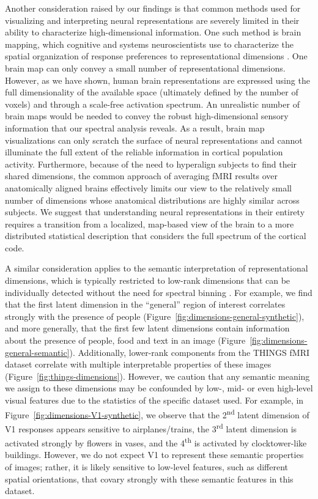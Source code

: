 \documentclass[10pt]{article}
\begin{document}
Another consideration raised by our findings is that common methods used for visualizing and interpreting neural representations are severely limited in their ability to characterize high-dimensional information. One such method is brain mapping, which cognitive and systems neuroscientists use to characterize the spatial organization of response preferences to representational dimensions \autocite{Huth2012,Bao2020,Tarhan2020,Hebart2023,Contier2024}. One brain map can only convey a small number of representational dimensions. However, as we have shown, human brain representations are expressed using the full dimensionality of the available space (ultimately defined by the number of voxels) and through a scale-free activation spectrum. An unrealistic number of brain maps would be needed to convey the robust high-dimensional sensory information that our spectral analysis reveals. As a result, brain map visualizations can only scratch the surface of neural representations and cannot illuminate the full extent of the reliable information in cortical population activity. Furthermore, because of the need to hyperalign subjects to find their shared dimensions, the common approach of averaging fMRI results over anatomically aligned brains effectively limits our view to the relatively small number of dimensions whose anatomical distributions are highly similar across subjects. We suggest that understanding neural representations in their entirety requires a transition from a localized, map-based view of the brain to a more distributed statistical description that considers the full spectrum of the cortical code.

A similar consideration applies to the semantic interpretation of representational dimensions, which is typically restricted to low-rank dimensions that can be individually detected without the need for spectral binning \autocite{Huth2012,Khosla2022,Tarhan2020,Hebart2023}. For example, we find that the first latent dimension in the ``general'' region of interest correlates strongly with the presence of people (Figure~\ref{fig:dimensions-general-synthetic}), and more generally, that the first few latent dimensions contain information about the presence of people, food and text in an image (Figure~\ref{fig:dimensions-general-semantic}). Additionally, lower-rank components from the THINGS fMRI dataset correlate with multiple interpretable properties of these images (Figure~\ref{fig:things-dimensions}). However, we caution that any semantic meaning we assign to these dimensions may be confounded by low-, mid- or even high-level visual features due to the statistics of the specific dataset used. For example, in Figure~\ref{fig:dimensions-V1-synthetic}, we observe that the 2\textsuperscript{nd} latent dimension of V1 responses appears sensitive to airplanes/trains, the 3\textsuperscript{rd} latent dimension is activated strongly by flowers in vases, and the 4\textsuperscript{th} is activated by clocktower-like buildings. However, we do not expect V1 to represent these semantic properties of images; rather, it is likely sensitive to low-level features, such as different spatial orientations, that covary strongly with these semantic features in this dataset.
\end{document}
